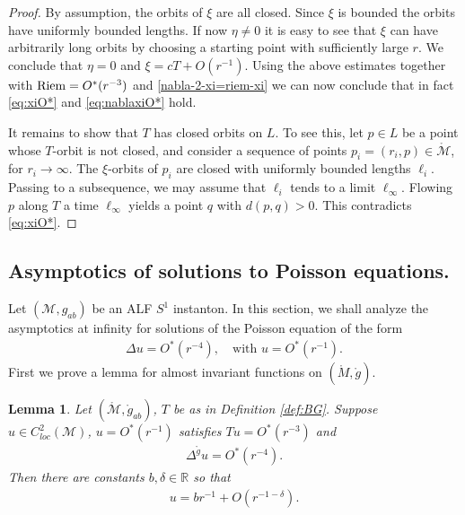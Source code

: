 \documentclass[a4paper,10pt,reqno]{amsart}
\newcommand{\Reals}{\mathbb{R}}
\newcommand{\Riem}{\mathop{\rm Riem}}
\newcommand{\cM}{\mathcal{M}}
\theoremstyle{plain}
\newtheorem{lemma}[thm]{Lemma}
\newcommand{\Mring}{\mathring{M}}
\newcommand{\gring}{\mathring{g}}
\numberwithin{equation}{section}
\begin{document}
\begin{proof}
By assumption, the orbits of $\xi$ are all closed. Since $\xi$ is bounded the orbits have uniformly bounded lengths. If now $\eta\neq 0$ it is easy to see that $\xi$ can have arbitrarily long orbits by choosing a starting point with sufficiently large $r$. We conclude that $\eta=0$ and $\xi = cT + O(r^{-1})$. 
Using the above estimates together with $\Riem = O^*(r^{-3})$ and \eqref{nabla-2-xi=riem-xi} we can now conclude that in fact \eqref{eq:xiO*} and \eqref{eq:nablaxiO*} hold. 

It remains to show that $T$ has closed orbits on $L$. To see this, let $p \in L$ be a point whose $T$-orbit is not closed, and consider a sequence of points $p_i = (r_i, p) \in \mathring{\cM}$, for $r_i \to \infty$. The $\xi$-orbits of $p_i$ are closed with uniformly bounded lengths $\ell_i$. Passing to a subsequence, we may assume that $\ell_i$ tends to a limit $\ell_\infty$. Flowing $p$ along $T$ a time $\ell_\infty$ yields a point $q$ with $d(p, q) > 0$. This contradicts \eqref{eq:xiO*}. 
\end{proof}

\subsection{Asymptotics of solutions to Poisson equations.} \label{sec:asympPoi}  
Let $(\cM, g_{ab})$ be an ALF $S^1$ instanton. In this section, we shall analyze the asymptotics at infinity for solutions of the Poisson equation of the form 
\begin{align} 
\Delta u = O^*(r^{-4}), \quad \text{with $u = O^*(r^{-1})$}.
\end{align} 
First we prove a lemma for almost invariant functions on $(\Mring,\gring)$.  

\begin{lemma} \label{lemma-poisson-gring} 
Let $(\mathring{\cM}, \mathring{g}_{ab})$, $T$ be as in Definition \ref{def:BG}. Suppose $u \in C^2_{loc}(\cM)$, $u = O^*(r^{-1})$ satisfies $Tu = O^*(r^{-3})$ and 
\begin{align}\label{eq:Pois*} 
\Delta^{\gring}u = O^*(r^{-4}).
\end{align}
Then there are constants $b, \delta \in \Reals$ so that 
\begin{align} 
u = br^{-1} + O(r^{-1-\delta}).
\end{align} 
\end{lemma}
\end{document}
